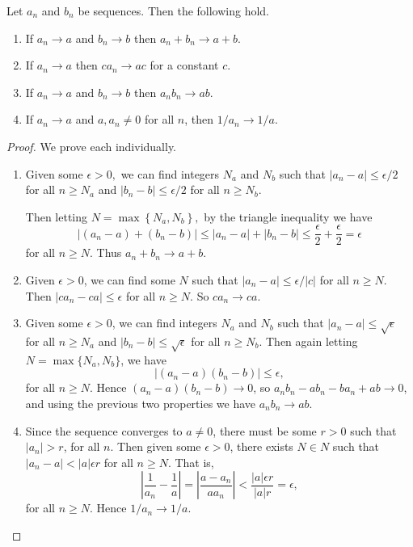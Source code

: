 \begin{proposition}
	\label{prop:manipulating}
	Let $a_n$ and $b_n$ be sequences. Then the following hold.
	\begin{enumerate}[label=(\roman*)]
		\item If $a_n \rightarrow a$ and $b_n \rightarrow b$ then $a_n + b_n \rightarrow a + b$.
		\item If $a_n \rightarrow a$ then $c a_n \rightarrow ac$ for a constant $c$.
		\item If $a_n \rightarrow a$ and $b_n \rightarrow b$ then $a_n b_n \rightarrow a b$.
		\item If $a_n \rightarrow a$ and $a, a_n \neq 0$ for all $n$, then $1/a_n \rightarrow 1/a$.
	\end{enumerate}
\end{proposition}
\begin{proof}
	We prove each individually.
	\begin{enumerate}[label=(\roman*)]
		\item Given some $\epsilon>0,$ we can find integers $N_{a}$ and $N_{b}$ such that $|a_n - a| \leq \epsilon/2$ for all $n \geq N_a$ and $|b_n - b| \leq \epsilon/2$ for all $n \geq N_b$.
		
		Then letting $N=\max \left\{N_{a}, N_{b}\right\},$ by the triangle inequality we have
		$$
			\left|\left(a_{n}-a\right)+\left(b_{n}-b\right)\right| \leq\left|a_{n}-a\right|+\left|b_{n}-b\right|
			\leq \frac{\epsilon}{2}+\frac{\epsilon}{2}=\epsilon
		$$
		for all $n \geq N$. Thus $a_{n}+b_{n} \rightarrow a+b$.
		\item Given $\epsilon > 0$, we can find some $N$ such that
		$|a_n - a| \leq \epsilon/|c|$ for all $n \geq N$. Then $|ca_n - ca| \leq \epsilon$ for all $n \geq N$. So $c a_n \rightarrow c a$.
		\item Given some $\epsilon > 0$, we can find integers $N_a$ and $N_b$ such that $|a_n - a| \leq \sqrt{\epsilon}$ for all $n \geq N_a$ and $|b_n - b| \leq \sqrt{\epsilon}$ for all $n \geq N_b$. Then again letting $N = \max\{N_a, N_b\}$, we have
		$$
			|(a_n - a)(b_n - b)| \leq \epsilon,
		$$
		for all $n \geq N$.
		Hence $(a_n - a)(b_n - b) \rightarrow 0$, so $a_n b_n - a b_n - b a_n + ab \rightarrow 0$, and using the previous two properties we have $a_n b_n \rightarrow ab$.
		\item Since the sequence converges to $a \neq 0$, there must be some $r>0$ such that $|a_n|>r$, for all $n$.
		Then given some $\epsilon > 0$, there exists $N \in N$ such that $|a_n - a| < |a|\epsilon r$ for all $n \geq N$. That is,
		$$
		\left|\frac{1}{a_n} - \frac{1}{a}\right|=\left|\frac{a - a_n}{a a_n}\right| < \frac{|a|\epsilon r}{|a|r} = \epsilon,
		$$
		for all $n \geq N$.
		Hence $1/a_n \rightarrow 1/a$. \qedhere
	\end{enumerate}
\end{proof}

